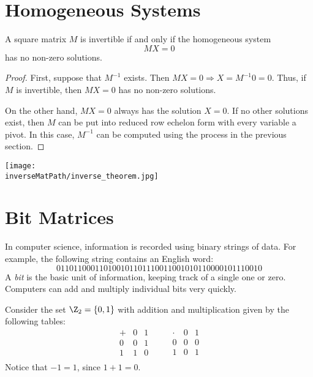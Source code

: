 
\section{Homogeneous Systems}

\begin{theorem}
A square matrix $M$ is invertible if and only if the homogeneous system $$MX=0$$ has no non-zero solutions.
\end{theorem}

\begin{proof}
First, suppose that $M^{-1}$ exists.  Then $MX=0 \Rightarrow X=M^{-1}0=0$.  Thus, if $M$ is invertible, then $MX=0$ has no non-zero solutions.

On the other hand, $MX=0$ always has the solution $X=0$.  If no other solutions exist, then $M$ can be put into reduced row echelon form with every variable a pivot.  In this case, $M^{-1}$ can be computed using the process in the previous section.
\end{proof}

\begin{center}
\texttt{[image: \\inverseMatPath/inverse\_theorem.jpg]}
\end{center}


\section{Bit Matrices}
In computer science, information is recorded using binary strings of data.  For example, the following string contains an English word:
\[
011011000110100101101110011001010110000101110010
\]
A \hypertarget{bits}{\emph{bit}} is the basic unit of information, keeping track of a single one or zero.  Computers can add and multiply individual bits very quickly.

Consider the set $\Z_2=\{0,1 \}$ with addition and multiplication given by the following tables:
\label{Z2}
\[
\begin{array}{c|cc}
+ & 0 & 1 \\ \hline
0 & 0 & 1 \\
1 & 1 & 0 \\
\end{array}
\qquad
\begin{array}{c|cc}
\cdot & 0 & 1 \\ \hline
0 & 0 & 0 \\
1 & 0 & 1 \\
\end{array}
\]
Notice that $-1=1$, since $1+1=0$.

